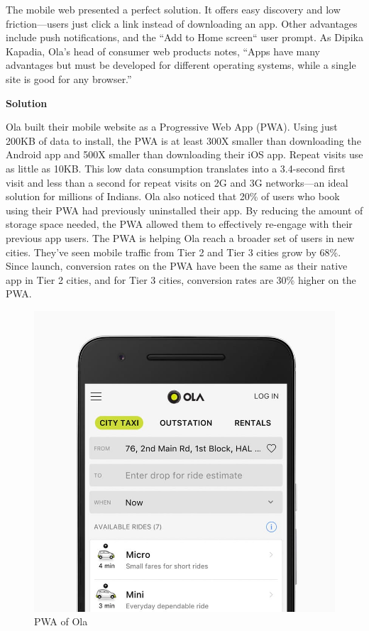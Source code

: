\documentclass[14pt,a4paper,final]{extreport}
\begin{document}
The mobile web presented a perfect solution. It offers easy discovery and low friction—users just click a link instead of downloading an app. Other advantages include push notifications, and the “Add to Home screen“ user prompt. As Dipika Kapadia, Ola’s head of consumer web products notes, “Apps have many advantages but must be developed for different operating systems, while a single site is good for any browser.”

\item \textbf{Solution}

Ola built their mobile website as a Progressive Web App (PWA). Using just 200KB of data to install, the PWA is at least 300X smaller than downloading the Android app and 500X smaller than downloading their iOS app. Repeat visits use as little as 10KB. This low data consumption translates into a 3.4-second first visit and less than a second for repeat visits on 2G and 3G networks—an ideal solution for millions of Indians.
Ola also noticed that 20\% of users who book using their PWA had previously uninstalled their app. By reducing the amount of storage space needed, the PWA allowed them to effectively re-engage with their previous app users.
The PWA is helping Ola reach a broader set of users in new cities. They’ve seen mobile traffic from Tier 2 and Tier 3 cities grow by 68\%. Since launch, conversion rates on the PWA have been the same as their native app in Tier 2 cities, and for Tier 3 cities, conversion rates are 30\% higher on the PWA.
\begin{figure}[t]
        \centering
		\includegraphics[scale=.3]{ss5.jpg}
		\caption{PWA of Ola}
\end{figure}
\end{document}
